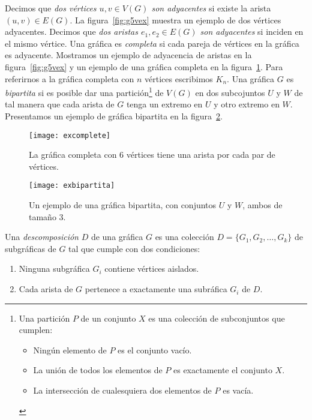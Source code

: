 Decimos que \emph{dos vértices $u,v\in V(G)$ son adyacentes} si existe la arista
$(u,v)\in E(G)$. La figura~\ref{fig:g5vex} muestra un ejemplo de dos vértices adyacentes.
Decimos que \emph{dos aristas $e_1,e_2 \in E(G)$ son adyacentes}
si inciden en el mismo vértice. Una gráfica es \emph{completa} si cada pareja de vértices
en la gráfica es adyacente. Mostramos un ejemplo de adyacencia de
aristas en la figura~\ref{fig:g5vex} y un ejemplo de una gráfica completa en la figura~\ref{fig:excomplete}.
Para referirnos a la gráfica completa con $n$
vértices escribimos $K_n$. Una gráfica $G$ es \emph{bipartita} si es posible
dar una partición\footnote{Una partición $P$ de un conjunto $X$ es
una colección de subconjuntos que cumplen:
\begin{itemize}
\item Ningún elemento de $P$ es el conjunto vacío.
\item La unión de todos los elementos de $P$ es exactamente el conjunto $X$.
\item La intersección de cualesquiera dos elementos de $P$ es vacía.
\end{itemize} }
de $V(G)$ en dos subcojuntos $U$ y $W$ de tal manera que cada
arista de $G$ tenga un extremo en $U$ y otro extremo en $W$. Presentamos
un ejemplo de gráfica bipartita en la figura~\ref{fig:exbipar}.
\begin{figure}[htb]
  \centering
  \texttt{[image: excomplete]}
  \caption{La gráfica completa con 6 vértices tiene una arista por cada par de vértices.}
  \label{fig:excomplete}
\end{figure}
\begin{figure}[h]
  \centering
  \texttt{[image: exbipartita]}
  \caption{Un ejemplo de una gráfica bipartita, con conjuntos $U$ y $W$, ambos de tamaño 3.}
  \label{fig:exbipar}
\end{figure}

Una \emph{descomposición} $D$ de una gráfica $G$ es una colección $D=\{G_1,G_2,\dots,G_k\}$ de
subgráficas de $G$ tal que cumple con dos condiciones:
\begin{enumerate}
  \item Ninguna subgráfica $G_i$ contiene vértices aislados.
  \item Cada arista de $G$ pertenece a exactamente una subráfica $G_i$ de $D$.
\end{enumerate}

